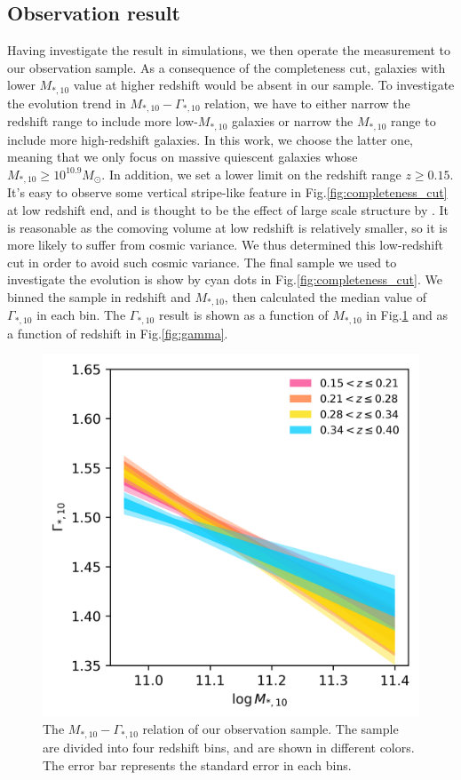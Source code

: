 \documentclass[fleqn,usenatbib]{mnras}
\begin{document}
\subsection{Observation result}
\label{sec:obres}
\par Having investigate the result in simulations, we then operate the measurement to our observation sample. As a consequence of the completeness cut, galaxies with lower $M_{*,10}$ value at higher redshift would be absent in our sample. To investigate the evolution trend in $M_{*,10 } - \Gamma_{*,10}$ relation, we have to either narrow the redshift range to include more low-$M_{*,10}$ galaxies or narrow the $M_{*,10}$ range to include more high-redshift galaxies. In this work, we choose the latter one, meaning that we only focus on massive quiescent galaxies whose $M_{*,10} \geq 10^{10.9} M_{\odot}$. In addition, we set a lower limit on the redshift range $ z \geq 0.15$. It's easy to observe some vertical stripe-like feature in Fig.\ref{fig:completeness_cut} at low redshift end, and is thought to be the effect of large scale structure by \cite{GAMAmain}. It is reasonable as the comoving volume at low redshift is relatively smaller, so it is more likely to suffer from cosmic variance. We thus determined this low-redshift cut in order to avoid such cosmic variance. The final sample we used to investigate the evolution is show by cyan dots in Fig.\ref{fig:completeness_cut}. We binned the sample in redshift and $M_{*,10}$, then calculated the median value of $\Gamma_{*,10}$ in each bin. The $\Gamma_{*,10}$ result is shown as a function of $M_{*,10}$ in Fig.\ref{fig:mg_relation} and as a function of redshift in Fig.\ref{fig:gamma}.
\begin{figure}
    \centering
    \includegraphics[width=\linewidth]{figure/mg_relation.png}
    \caption{The $M_{*,10} - \Gamma_{*,10}$ relation of our observation sample. The sample are divided into four redshift bins, and are shown in different colors. The error bar represents the standard error in each bins.}
    \label{fig:mg_relation}
\end{figure}
\end{document}
